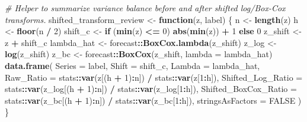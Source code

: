 \documentclass[
  10pt,
]{extarticle}
\newenvironment{Shaded}{\begin{snugshade}}{\end{snugshade}}
\newcommand{\AttributeTok}[1]{\textcolor[rgb]{0.13,0.29,0.53}{#1}}
\newcommand{\CommentTok}[1]{\textcolor[rgb]{0.56,0.35,0.01}{\textit{#1}}}
\newcommand{\ConstantTok}[1]{\textcolor[rgb]{0.56,0.35,0.01}{#1}}
\newcommand{\ControlFlowTok}[1]{\textcolor[rgb]{0.13,0.29,0.53}{\textbf{#1}}}
\newcommand{\DecValTok}[1]{\textcolor[rgb]{0.00,0.00,0.81}{#1}}
\newcommand{\FunctionTok}[1]{\textcolor[rgb]{0.13,0.29,0.53}{\textbf{#1}}}
\newcommand{\NormalTok}[1]{#1}
\newcommand{\OtherTok}[1]{\textcolor[rgb]{0.56,0.35,0.01}{#1}}
\newcommand{\SpecialCharTok}[1]{\textcolor[rgb]{0.81,0.36,0.00}{\textbf{#1}}}
\begin{document}
\begin{Shaded}
\begin{Highlighting}[]
\CommentTok{\# Helper to summarize variance balance before and after shifted log/Box{-}Cox transforms.}
\NormalTok{shifted\_transform\_review }\OtherTok{\textless{}{-}} \ControlFlowTok{function}\NormalTok{(z, label) \{}
\NormalTok{  n }\OtherTok{\textless{}{-}} \FunctionTok{length}\NormalTok{(z)}
\NormalTok{  h }\OtherTok{\textless{}{-}} \FunctionTok{floor}\NormalTok{(n }\SpecialCharTok{/} \DecValTok{2}\NormalTok{)}
\NormalTok{  shift\_c }\OtherTok{\textless{}{-}} \ControlFlowTok{if}\NormalTok{ (}\FunctionTok{min}\NormalTok{(z) }\SpecialCharTok{\textless{}=} \DecValTok{0}\NormalTok{) }\FunctionTok{abs}\NormalTok{(}\FunctionTok{min}\NormalTok{(z)) }\SpecialCharTok{+} \DecValTok{1} \ControlFlowTok{else} \DecValTok{0}
\NormalTok{  z\_shift }\OtherTok{\textless{}{-}}\NormalTok{ z }\SpecialCharTok{+}\NormalTok{ shift\_c}
\NormalTok{  lambda\_hat }\OtherTok{\textless{}{-}}\NormalTok{ forecast}\SpecialCharTok{::}\FunctionTok{BoxCox.lambda}\NormalTok{(z\_shift)}
\NormalTok{  z\_log }\OtherTok{\textless{}{-}} \FunctionTok{log}\NormalTok{(z\_shift)}
\NormalTok{  z\_bc }\OtherTok{\textless{}{-}}\NormalTok{ forecast}\SpecialCharTok{::}\FunctionTok{BoxCox}\NormalTok{(z\_shift, }\AttributeTok{lambda =}\NormalTok{ lambda\_hat)}
  \FunctionTok{data.frame}\NormalTok{(}
    \AttributeTok{Series =}\NormalTok{ label,}
    \AttributeTok{Shift =}\NormalTok{ shift\_c,}
    \AttributeTok{Lambda =}\NormalTok{ lambda\_hat,}
    \AttributeTok{Raw\_Ratio =}\NormalTok{ stats}\SpecialCharTok{::}\FunctionTok{var}\NormalTok{(z[(h }\SpecialCharTok{+} \DecValTok{1}\NormalTok{)}\SpecialCharTok{:}\NormalTok{n]) }\SpecialCharTok{/}\NormalTok{ stats}\SpecialCharTok{::}\FunctionTok{var}\NormalTok{(z[}\DecValTok{1}\SpecialCharTok{:}\NormalTok{h]),}
    \AttributeTok{Shifted\_Log\_Ratio =}\NormalTok{ stats}\SpecialCharTok{::}\FunctionTok{var}\NormalTok{(z\_log[(h }\SpecialCharTok{+} \DecValTok{1}\NormalTok{)}\SpecialCharTok{:}\NormalTok{n]) }\SpecialCharTok{/}\NormalTok{ stats}\SpecialCharTok{::}\FunctionTok{var}\NormalTok{(z\_log[}\DecValTok{1}\SpecialCharTok{:}\NormalTok{h]),}
    \AttributeTok{Shifted\_BoxCox\_Ratio =}\NormalTok{ stats}\SpecialCharTok{::}\FunctionTok{var}\NormalTok{(z\_bc[(h }\SpecialCharTok{+} \DecValTok{1}\NormalTok{)}\SpecialCharTok{:}\NormalTok{n]) }\SpecialCharTok{/}\NormalTok{ stats}\SpecialCharTok{::}\FunctionTok{var}\NormalTok{(z\_bc[}\DecValTok{1}\SpecialCharTok{:}\NormalTok{h]),}
    \AttributeTok{stringsAsFactors =} \ConstantTok{FALSE}
\NormalTok{  )}
\NormalTok{\}}


\end{Highlighting}
\end{Shaded}
\end{document}
